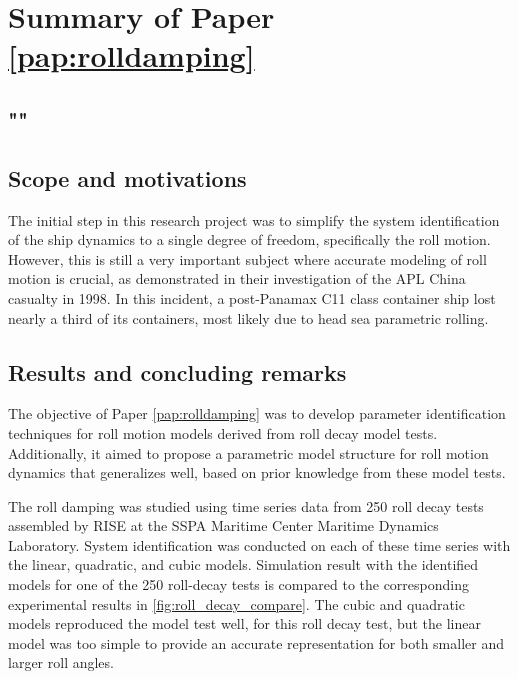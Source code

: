 \section{Summary of Paper \ref{pap:rolldamping}}
\subsection*{""}
\subsection*{Scope and motivations}
The initial step in this research project was to simplify the system identification of the ship dynamics to a single degree of freedom, specifically the roll motion. However, this is still a very important subject where accurate modeling of roll motion is crucial, as \textcite{franceInvestigationHeadSeaParametric2001} demonstrated in their investigation of the APL China casualty in 1998. In this incident, a post-Panamax C11 class container ship lost nearly a third of its containers, most likely due to head sea parametric rolling.

\subsection*{Results and concluding remarks}
The objective of Paper \ref{pap:rolldamping} was to develop parameter identification techniques for roll motion models derived from roll decay model tests. Additionally, it aimed to propose a parametric model structure for roll motion dynamics that generalizes well, based on prior knowledge from these model tests.

The roll damping was studied using time series data from 250 roll decay tests assembled by RISE at the SSPA Maritime Center Maritime Dynamics Laboratory.
System identification was conducted on each of these time series with the linear, quadratic, and cubic models. Simulation result with the identified models for one of the 250 roll-decay tests is compared to the corresponding experimental results in \autoref{fig:roll_decay_compare}. The cubic and quadratic models reproduced the model test well, for this roll decay test, but the linear model was too simple to provide an accurate representation for both smaller and larger roll angles.

